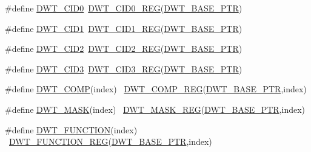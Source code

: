 \begin{DoxyCompactItemize}
\item 
\#define \hyperlink{group___d_w_t___register___accessor___macros_gaa2c04524a16a021f7329eacf04fee2a3}{D\+W\+T\+\_\+\+C\+I\+D0}~\hyperlink{group___d_w_t___register___accessor___macros_gab77163d0264bc009ac5622e766e24a93}{D\+W\+T\+\_\+\+C\+I\+D0\+\_\+\+R\+EG}(\hyperlink{group___d_w_t___peripheral_ga3b46dfb2ea7946c6938028d879c82cb1}{D\+W\+T\+\_\+\+B\+A\+S\+E\+\_\+\+P\+TR})
\item 
\#define \hyperlink{group___d_w_t___register___accessor___macros_gafbdf560130182c09345ce399450855d9}{D\+W\+T\+\_\+\+C\+I\+D1}~\hyperlink{group___d_w_t___register___accessor___macros_ga029e546d2d8949b27c55a4785da019eb}{D\+W\+T\+\_\+\+C\+I\+D1\+\_\+\+R\+EG}(\hyperlink{group___d_w_t___peripheral_ga3b46dfb2ea7946c6938028d879c82cb1}{D\+W\+T\+\_\+\+B\+A\+S\+E\+\_\+\+P\+TR})
\item 
\#define \hyperlink{group___d_w_t___register___accessor___macros_ga3ad9ab1e6664d6ff6c2e65597dc0746a}{D\+W\+T\+\_\+\+C\+I\+D2}~\hyperlink{group___d_w_t___register___accessor___macros_gab6a7a7788e8fdbbe47ac13383064a1e8}{D\+W\+T\+\_\+\+C\+I\+D2\+\_\+\+R\+EG}(\hyperlink{group___d_w_t___peripheral_ga3b46dfb2ea7946c6938028d879c82cb1}{D\+W\+T\+\_\+\+B\+A\+S\+E\+\_\+\+P\+TR})
\item 
\#define \hyperlink{group___d_w_t___register___accessor___macros_gadd1089d7c9184482d47e6ddaa124c47c}{D\+W\+T\+\_\+\+C\+I\+D3}~\hyperlink{group___d_w_t___register___accessor___macros_ga7a29c7e2d907c373f1ffa34877e83852}{D\+W\+T\+\_\+\+C\+I\+D3\+\_\+\+R\+EG}(\hyperlink{group___d_w_t___peripheral_ga3b46dfb2ea7946c6938028d879c82cb1}{D\+W\+T\+\_\+\+B\+A\+S\+E\+\_\+\+P\+TR})
\item 
\#define \hyperlink{group___d_w_t___register___accessor___macros_ga8cd13337dbf7cec23c7f8c3621860e9e}{D\+W\+T\+\_\+\+C\+O\+MP}(index)                                                ~\hyperlink{group___d_w_t___register___accessor___macros_gad03eebac5bf5c3c3e461e156ba6e37ae}{D\+W\+T\+\_\+\+C\+O\+M\+P\+\_\+\+R\+EG}(\hyperlink{group___d_w_t___peripheral_ga3b46dfb2ea7946c6938028d879c82cb1}{D\+W\+T\+\_\+\+B\+A\+S\+E\+\_\+\+P\+TR},index)
\item 
\#define \hyperlink{group___d_w_t___register___accessor___macros_ga293560983db73f0a6acead2a597fe349}{D\+W\+T\+\_\+\+M\+A\+SK}(index)                                                ~\hyperlink{group___d_w_t___register___accessor___macros_ga16461875f56f3b91ee27a53a9f4dbc78}{D\+W\+T\+\_\+\+M\+A\+S\+K\+\_\+\+R\+EG}(\hyperlink{group___d_w_t___peripheral_ga3b46dfb2ea7946c6938028d879c82cb1}{D\+W\+T\+\_\+\+B\+A\+S\+E\+\_\+\+P\+TR},index)
\item 
\#define \hyperlink{group___d_w_t___register___accessor___macros_ga6fc901c7f1391678b4058358fd39b877}{D\+W\+T\+\_\+\+F\+U\+N\+C\+T\+I\+ON}(index)                                        ~\hyperlink{group___d_w_t___register___accessor___macros_gaedc0f311fdf85789a988b58375481265}{D\+W\+T\+\_\+\+F\+U\+N\+C\+T\+I\+O\+N\+\_\+\+R\+EG}(\hyperlink{group___d_w_t___peripheral_ga3b46dfb2ea7946c6938028d879c82cb1}{D\+W\+T\+\_\+\+B\+A\+S\+E\+\_\+\+P\+TR},index)
\end{DoxyCompactItemize}


